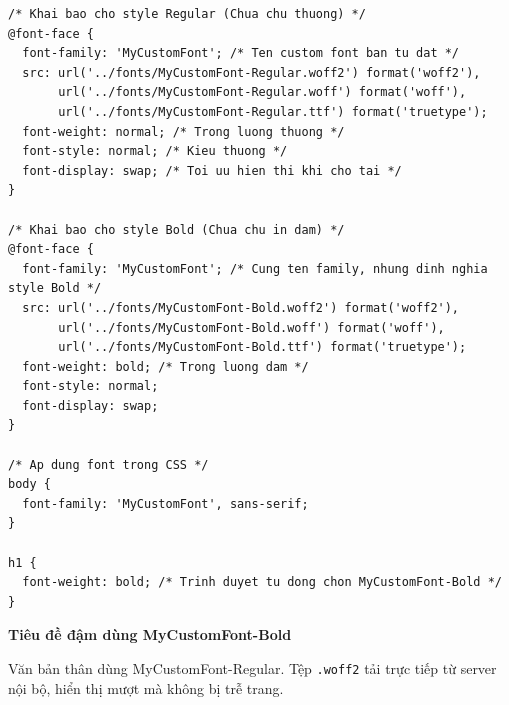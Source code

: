 \documentclass[11pt,oneside]{book}
\newcommand{\codeinline}[1]{\textcolor{accentOrange}{\texttt{#1}}}
\begin{document}
\begin{codeWindow}
\begin{lstlisting}[language=CSS3]
/* Khai bao cho style Regular (Chua chu thuong) */
@font-face {
  font-family: 'MyCustomFont'; /* Ten custom font ban tu dat */
  src: url('../fonts/MyCustomFont-Regular.woff2') format('woff2'),
       url('../fonts/MyCustomFont-Regular.woff') format('woff'),
       url('../fonts/MyCustomFont-Regular.ttf') format('truetype');
  font-weight: normal; /* Trong luong thuong */
  font-style: normal; /* Kieu thuong */
  font-display: swap; /* Toi uu hien thi khi cho tai */
}

/* Khai bao cho style Bold (Chua chu in dam) */
@font-face {
  font-family: 'MyCustomFont'; /* Cung ten family, nhung dinh nghia style Bold */
  src: url('../fonts/MyCustomFont-Bold.woff2') format('woff2'),
       url('../fonts/MyCustomFont-Bold.woff') format('woff'),
       url('../fonts/MyCustomFont-Bold.ttf') format('truetype');
  font-weight: bold; /* Trong luong dam */
  font-style: normal;
  font-display: swap;
}

/* Ap dung font trong CSS */
body {
  font-family: 'MyCustomFont', sans-serif;
}

h1 {
  font-weight: bold; /* Trinh duyet tu dong chon MyCustomFont-Bold */
}
\end{lstlisting}
\end{codeWindow}

\begin{browserWindow}
\begin{tcolorbox}[arc=4pt, colback=white, colframe=primaryBlue!30, boxrule=0.8pt, top=10pt, bottom=10pt, left=12pt, right=12pt]
  {\sffamily\bfseries\color{primaryBlue}\Large Tiêu đề đậm dùng MyCustomFont-Bold}\par\vspace{6pt}
  {\sffamily\small Văn bản thân dùng MyCustomFont-Regular. Tệp \codeinline{.woff2} tải trực tiếp từ server nội bộ, hiển thị mượt mà không bị trễ trang.}
\end{tcolorbox}
\end{browserWindow}
\end{document}
